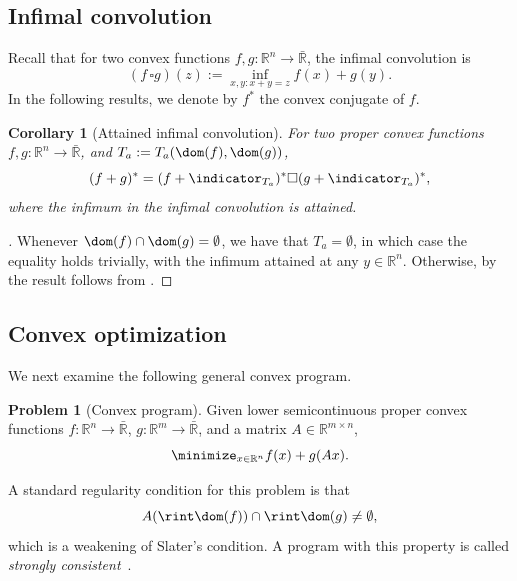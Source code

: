 \documentclass{article}
\theoremstyle{plain}
\newtheorem{corollary}{Corollary}[section]
\theoremstyle{definition}
\newtheorem{problem}{Problem}[section]
\theoremstyle{remark}
\begin{document}
\subsection{Infimal convolution}
\label{loc:body.main_results.infimal_convolution}
Recall that for two convex functions $f,g:\mathbb{R}^n \to \bar{\mathbb{R}}$, the infimal convolution is
\begin{equation*}
(f\,  \square g)(z) := \inf_{x, y : x + y = z} f(x) + g(y).
\end{equation*}
In the following results, we denote by $f^*$ the convex conjugate of $f$.
\begin{corollary}[Attained infimal convolution]
\label{loc:attained_infimal_convolution_in_the_conjugate_of_a_sum.statement}
For two proper convex functions $f, g:\mathbb{R}^n \to \bar{\mathbb{R}}$,
and $T_a := T_a(\dom(f), \dom(g))$,
\begin{equation*}
(f+g)^* = (f + \indicator_{T_a})^* \square (g + \indicator_{T_a})^*,
\end{equation*}
where the infimum in the infimal convolution is attained.
\end{corollary}
\begin{proof}[\hypertarget{loc:attained_infimal_convolution_in_the_conjugate_of_a_sum.proof}Proof of \Cref{loc:attained_infimal_convolution_in_the_conjugate_of_a_sum.statement}]

Whenever $\dom(f) \cap \dom(g) =  \emptyset$, we have that $T_a = \emptyset$, in which case the equality
holds trivially, with the infimum attained at any $y \in \mathbb{R}^n$. 
Otherwise, by 
the result follows from \cite[Theorem 20.1]{rockafellarConvexAnalysis1970}.
\end{proof}
\subsection{Convex optimization}
\label{loc:body.main_results.convex_optimization}
We next examine the following general convex program.
\begin{problem}[Convex program]
\label{loc:optimality_condition_for_the_exact_fr_dual.program}
Given lower semicontinuous proper convex functions $f:\mathbb{R}^n\to \bar{\mathbb{R}}$, $g:\mathbb{R}^m \to \bar{\mathbb{R}}$, and a matrix $A  \in \mathbb{R}^{m \times n}$,
\begin{equation*}
\minimize_{x \in \mathbb{R}^n} f(x)+ g(Ax).
\end{equation*}
\end{problem}
A standard regularity condition for this problem is that
\begin{equation*}
A(\rint \dom(f)) \cap \rint \dom(g) \neq \emptyset,
\end{equation*}
which is a weakening of Slater's condition.
A program with this property is called \emph{strongly consistent}~\cite[Theorem 31.2]{rockafellarConvexAnalysis1970}.
\end{document}
